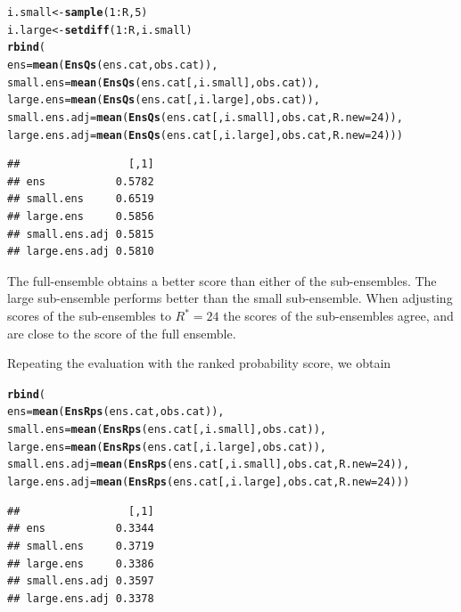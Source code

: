 \documentclass[article]{jss}\usepackage{graphicx, color}
\makeatletter
\newcommand{\hlfunctioncall}[1]{\textcolor[rgb]{0,0.501960784313725,0.752941176470588}{\textbf{#1}}}%
\newenvironment{kframe}{%
 \def\at@end@of@kframe{}%
 \ifinner\ifhmode%
  \def\at@end@of@kframe{\end{minipage}}%
  \begin{minipage}{\columnwidth}%
 \fi\fi%
 \def\FrameCommand##1{\hskip\@totalleftmargin \hskip-\fboxsep
 \colorbox{shadecolor}{##1}\hskip-\fboxsep
     \hskip-\linewidth \hskip-\@totalleftmargin \hskip\columnwidth}%
 \MakeFramed {\advance\hsize-\width
   \@totalleftmargin\z@ \linewidth\hsize
   \@setminipage}}%
 {\par\unskip\endMakeFramed%
 \at@end@of@kframe}
\newenvironment{knitrout}{}{} %
\makeatother
\begin{document}
\begin{knitrout}
\color{fgcolor}\begin{kframe}
\begin{alltt}
i.small <- \hlfunctioncall{sample}(1:R, 5)
i.large <- \hlfunctioncall{setdiff}(1:R, i.small)
\hlfunctioncall{rbind}(
ens           = \hlfunctioncall{mean}(\hlfunctioncall{EnsQs}(ens.cat,            obs.cat)),
small.ens     = \hlfunctioncall{mean}(\hlfunctioncall{EnsQs}(ens.cat[, i.small], obs.cat)),
large.ens     = \hlfunctioncall{mean}(\hlfunctioncall{EnsQs}(ens.cat[, i.large], obs.cat)),
small.ens.adj = \hlfunctioncall{mean}(\hlfunctioncall{EnsQs}(ens.cat[, i.small], obs.cat, R.new=24)),
large.ens.adj = \hlfunctioncall{mean}(\hlfunctioncall{EnsQs}(ens.cat[, i.large], obs.cat, R.new=24)))
\end{alltt}
\begin{verbatim}
##                 [,1]
## ens           0.5782
## small.ens     0.6519
## large.ens     0.5856
## small.ens.adj 0.5815
## large.ens.adj 0.5810
\end{verbatim}
\end{kframe}
\end{knitrout}


The full-ensemble obtains a better score than either of the sub-ensembles.
The large sub-ensemble performs better than the small sub-ensemble.
When adjusting scores of the sub-ensembles to $R^*=24$ the scores of the sub-ensembles agree, and are close to the score of the full ensemble.

Repeating the evaluation with the ranked probability score, we obtain

\begin{knitrout}
\color{fgcolor}\begin{kframe}
\begin{alltt}
\hlfunctioncall{rbind}(
ens           = \hlfunctioncall{mean}(\hlfunctioncall{EnsRps}(ens.cat,            obs.cat)),
small.ens     = \hlfunctioncall{mean}(\hlfunctioncall{EnsRps}(ens.cat[, i.small], obs.cat)),
large.ens     = \hlfunctioncall{mean}(\hlfunctioncall{EnsRps}(ens.cat[, i.large], obs.cat)),
small.ens.adj = \hlfunctioncall{mean}(\hlfunctioncall{EnsRps}(ens.cat[, i.small], obs.cat, R.new=24)),
large.ens.adj = \hlfunctioncall{mean}(\hlfunctioncall{EnsRps}(ens.cat[, i.large], obs.cat, R.new=24)))
\end{alltt}
\begin{verbatim}
##                 [,1]
## ens           0.3344
## small.ens     0.3719
## large.ens     0.3386
## small.ens.adj 0.3597
## large.ens.adj 0.3378
\end{verbatim}
\end{kframe}
\end{knitrout}
\end{document}
